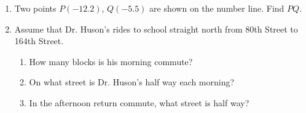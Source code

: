 \begin{enumerate}
\item Two points $P(-12.2)$, $Q(-5.5)$ are shown on the number line. Find $PQ$. \par \smallskip
{} \vspace{3cm}

\item Assume that Dr. Huson's rides to school straight north from 80th Street to 164th Street.
\begin{enumerate}[itemsep=1cm]
    \item How many blocks is his morning commute?
    \item On what street is Dr. Huson's half way each morning?
    \item In the afternoon return commute, what street is half way?
\end{enumerate}


\end{enumerate}
